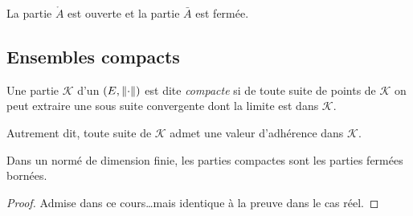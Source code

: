                                 \begin{remark}
                                    La partie $\mathring{A}$ est ouverte et la partie $\bar A$ est fermée.
                                \end{remark}
                                \begin{exemple}
                                    \pl{\rep{9cm}	}
                                \end{exemple}

                                \sld{\vfill\pagebreak[5]}%
                                \subsection{Ensembles compacts}



                                \begin{definition}
                                    Une partie $\mathcal K$ d'un \rev{} $(E,\left\lVert\cdot\right\rVert)$ est dite \emph{compacte} si de toute suite de points de $\mathcal K$ on peut extraire une sous suite convergente dont la limite est dans $\mathcal K$.
                                \end{definition}
                                Autrement dit, toute suite de $\mathcal K$ admet une valeur d'adhérence dans $\mathcal K$.

                                \begin{theorem}
                                     Dans un \rev{} normé de dimension finie, les parties compactes sont les parties fermées bornées.
                                \end{theorem}

                                \begin{proof}
                                    Admise dans ce cours\ldots mais identique à la preuve dans le cas réel.
                                \end{proof}

                                \begin{exemple}
                                    \pl{\rep{3cm}	}
                                \end{exemple}


